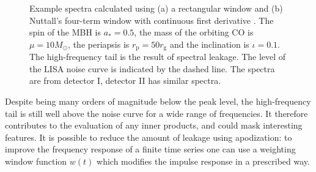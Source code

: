 \documentclass[useAMS,usedcolumn,usegraphicx,usenatbib]{mn2e}
\newcommand{\sub}[1]{\ensuremath{_\mathrm{#1}}}
\begin{document}
\begin{figure}
  \begin{center}
    \quad
    \caption{Example spectra calculated using (a) a rectangular window and (b) Nuttall's four-term window with continuous first derivative \citep{Nuttall1981}. The spin of the MBH is $a_\ast = 0.5$, the mass of the orbiting CO is $\mu = 10 M_\odot$, the periapsis is $r\sub{p} = 50 r\sub{g}$ and the inclination is $\iota = 0.1$. The high-frequency tail is the result of spectral leakage. The level of the LISA noise curve is indicated by the dashed line. The spectra are from detector I, detector II has similar spectra.}
    \label{fig:Windowing}
  \end{center}
\end{figure}

Despite being many orders of magnitude below the peak level, the high-frequency tail is still well above the noise curve for a wide range of frequencies. It therefore contributes to the evaluation of any inner products, and could mask interesting features. It is possible to reduce the amount of leakage using apodization: to improve the frequency response of a finite time series one can use a weighting window function $w(t)$ which modifies the impulse response in a prescribed way.
\end{document}
